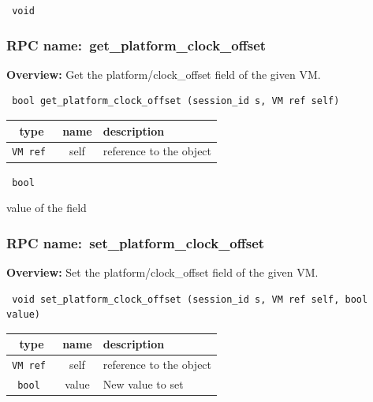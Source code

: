 {\tt 
void
}



\vspace{0.3cm}
\vspace{0.3cm}
\vspace{0.3cm}
\subsubsection{RPC name:~get\_platform\_clock\_offset}

{\bf Overview:} 
Get the platform/clock\_offset field of the given VM.

\begin{verbatim} bool get_platform_clock_offset (session_id s, VM ref self)\end{verbatim}



 
\vspace{0.3cm}
\begin{tabular}{|c|c|p{7cm}|}
 \hline
{\bf type} & {\bf name} & {\bf description} \\ \hline
{\tt VM ref } & self & reference to the object \\ \hline 

\end{tabular}

\vspace{0.3cm}

{\tt 
bool
}


value of the field
\vspace{0.3cm}
\vspace{0.3cm}
\vspace{0.3cm}
\subsubsection{RPC name:~set\_platform\_clock\_offset}

{\bf Overview:} 
Set the platform/clock\_offset field of the given VM.

\begin{verbatim} void set_platform_clock_offset (session_id s, VM ref self, bool value)\end{verbatim}



 
\vspace{0.3cm}
\begin{tabular}{|c|c|p{7cm}|}
 \hline
{\bf type} & {\bf name} & {\bf description} \\ \hline
{\tt VM ref } & self & reference to the object \\ \hline 

{\tt bool } & value & New value to set \\ \hline 

\end{tabular}

